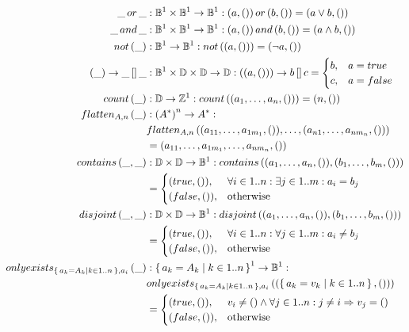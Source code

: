 \begin{defbox}
\begin{align*}
\_\,or\,\_ &: \mathbb{B}^1 \times \mathbb{B}^1 \to \mathbb{B}^1 : (a, ())\,or\,(b, ()) = (a \lor b, ()) \\
\_\,and\,\_ &: \mathbb{B}^1 \times \mathbb{B}^1 \to \mathbb{B}^1 : (a, ())\,and\,(b, ()) = (a \land b, ()) \\
not\left(\_\right) &: \mathbb{B}^1 \to \mathbb{B}^1 : not\left((a, ())\right) = (\lnot a, ()) \\
(\_) \rightarrow \_\,[]\,\_ &: \mathbb{B}^1 \times \mathbb{D} \times \mathbb{D} \to \mathbb{D} : ((a, ())) \rightarrow b\,[]\,c =
\begin{cases}
b, & a = true\\
c, & a = false
\end{cases} \\
count\left(\_\right) &: \mathbb{D} \to \mathbb{Z}^1 : count\left((a_1, \dots, a_n, ())\right) = (n, ()) \\
flatten_{A, n}\left(\_\right) &: \left(A^{*}\right)^n \to A^{*} : \\
&flatten_{A, n}\left((a_{11}, \dots, a_{1m_1}, ()), \dots, (a_{n1}, \dots, a_{nm_n}, ())\right) \\
&= (a_{11}, \dots, a_{1m_1}, \dots, a_{nm_n}, ()) \\
contains\left(\_, \_\right) &: \mathbb{D} \times \mathbb{D} \to \mathbb{B}^1 : contains\left((a_1, \dots, a_n, ()), (b_1, \dots, b_m, ())\right) \\
&= \begin{cases}
(true, ()), & \forall i \in 1..n : \exists j \in 1..m : a_i = b_j\\
(false, ()), & \text{otherwise}
\end{cases} \\
disjoint\left(\_, \_\right) &: \mathbb{D} \times \mathbb{D} \to \mathbb{B}^1 : disjoint\left((a_1, \dots, a_n, ()), (b_1, \dots, b_m, ())\right) \\
&= \begin{cases}
(true, ()), & \forall i \in 1..n : \forall j \in 1..m : a_i \neq b_j\\
(false, ()), & \text{otherwise}
\end{cases} \\
onlyexists_{\left\{\,a_k=A_k \mid k\in 1..n\,\right\}, a_i}\left(\_\right) &: \left\{\,a_k=A_k \mid k\in 1..n\,\right\}^1 \to \mathbb{B}^1 : \\ &onlyexists_{\left\{\,a_k=A_k \mid k\in 1..n\,\right\}, a_i}\left((\left\{\,a_k=v_k \mid k\in 1..n\,\right\}, ())\right) \\
&= \begin{cases}
(true, ()), & v_i \neq () \land \forall j \in 1..n : j \neq i \Rightarrow v_j = () \\
(false, ()), & \text{otherwise}

\end{cases}
\end{align*}
\end{defbox}
